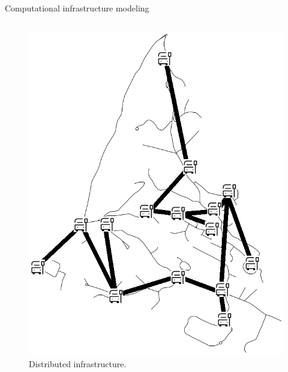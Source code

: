 \documentclass[Ligatures=TeX,table,svgnames,usetotalslideindicator,compress,10pt,aspectratio=169]{beamer}
\begin{document}
\begin{frame}{Computational infrastructure modeling}
\begin{columns}
\begin{column}{0.5\textwidth}
  
   \begin{figure}[!h]
        \centering
        \includegraphics[width=.8\textwidth]{images/vieille-toulouse.png}
        \caption{Distributed  infrastructure.}
      \end{figure}

  
    \end{column}
\end{columns}
  \end{frame}
\end{document}
